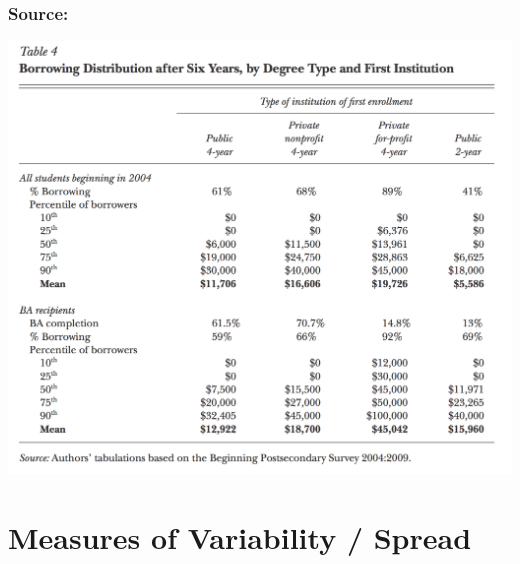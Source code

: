 \begin{frame}
\frametitle{\footnotesize Source: \href{http://www.aeaweb.org/articles.php?doi=10.1257/jep.26.1.165}{}}


\centering \includegraphics[scale = 0.18]{./images/student_borrowing}


\end{frame}


\section{Measures of Variability / Spread}

